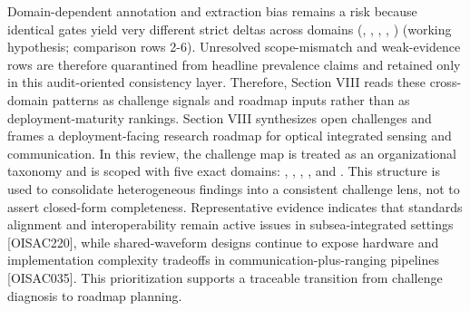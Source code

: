 \markdownRendererUlItem Domain-dependent annotation and extraction bias remains a risk because identical gates yield very different strict deltas across domains (, , , , ) (working hypothesis; comparison rows \markdownRendererHash{}2-\markdownRendererHash{}6).\markdownRendererUlItemEnd 
\markdownRendererUlItem Unresolved scope-mismatch and weak-evidence rows are therefore quarantined from headline prevalence claims and retained only in this audit-oriented consistency layer.\markdownRendererUlItemEnd 
\markdownRendererUlEndTight \markdownRendererInterblockSeparator
{}Therefore, Section VIII reads these cross-domain patterns as challenge signals and roadmap inputs rather than as deployment-maturity rankings.\markdownRendererInterblockSeparator
{}
\markdownRendererSectionEnd 
\markdownRendererSectionEnd 
\markdownRendererSectionEnd 
\markdownRendererSectionEnd \markdownRendererSectionBegin
{}\markdownRendererInterblockSeparator
{}Section VIII synthesizes open challenges and frames a deployment-facing research roadmap for optical integrated sensing and communication. In this review, the challenge map is treated as an organizational taxonomy and is scoped with five exact domains: , , , , and . This structure is used to consolidate heterogeneous findings into a consistent challenge lens, not to assert closed-form completeness. Representative evidence indicates that standards alignment and interoperability remain active issues in subsea-integrated settings [O\markdownRendererUnderscore{}ISAC\markdownRendererUnderscore{}220], while shared-waveform designs continue to expose hardware and implementation complexity tradeoffs in communication-plus-ranging pipelines [O\markdownRendererUnderscore{}ISAC\markdownRendererUnderscore{}035]. This prioritization supports a traceable transition from challenge diagnosis to roadmap planning.\markdownRendererParagraphSeparator
